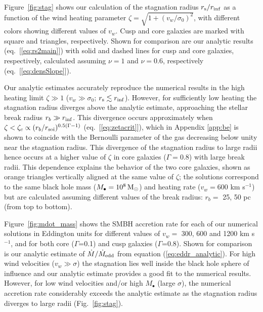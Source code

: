 \documentclass[usenatbib,fleqn]{mn2e}
\newcommand{\Mbh}[1][]{M_{\bullet#1}}
\newcommand{\vwO}{v_{w}}
\newcommand{\densSlope}{\nu}
\begin{document}
Figure~\ref{fig:stag} shows our calculation of the stagnation radius
$r_{\rm s}/r_{\rm inf}$ as a function of the wind heating parameter
$\zeta = \sqrt{1+(v_w/\sigma_0)^{2}}$, with different colors
showing different values of $v_{w}$.  Cusp and core galaxies are
marked with square and triangles, respectively.  Shown for comparison
are our analytic results (eq.~[\ref{eq:rs2main}]) with solid and
dashed lines for cusp and core galaxies, respectively, calculated
assuming $\densSlope = 1$ and $\densSlope= 0.6$, respectively
(eq.~[\ref{eq:densSlope}]).

Our analytic estimates accurately reproduce the numerical results in
the high heating limit $\zeta \gg 1$ ($v_w \gg \sigma_0$; $r_{\rm s}
\lesssim r_{\rm inf}$).  However, for sufficiently low heating the
stagnation radius diverges above the analytic estimate, approaching
the stellar break radius $r_b \gg r_{\rm inf}$.  This divergence
occurs approximately when $\zeta < \zeta_c \propto (r_b/r_{\rm
  soi})^{0.5(\Gamma-1)}$ (eq.~[\ref{eq:zetacrit}]), which in Appendix
\ref{app:be} is shown to coincide with the Bernoulli parameter of the gas decreasing below unity near the stagnation radius.  This divergence of the stagnation radius to large radii hence occurs at a higher value of $\zeta$ in core galaxies ($\Gamma = 0.8$) with large break radii.  This dependence explains the behavior of the two core galaxies, shown as
orange triangles vertically aligned at the same value of
$\zeta$; the solutions correspond to the same black hole mass
($\Mbh = 10^8 \Msun$) and heating rate ($v_w = 600$ km s$^{-1}$) but are calculated assuming
different values of the break radius: $r_{b} =$ 25, 50 pc (from top to
bottom). 

Figure~\ref{fig:mdot_mass} shows the SMBH accretion rate for each of
our numerical solutions in Eddington units for different values of
$\vwO =$ 300, 600 and 1200 km s$^{-1}$, and for both core
($\Gamma$=0.1) and cusp galaxies ($\Gamma$=0.8).  Shown for comparison
is our analytic estimate of $\dot{M}/\dot{M}_{\rm edd}$ from equation
(\ref{eq:eddr_analytic}).  For high wind velocities ($v_{w} \gg
\sigma$) the stagnation lies well inside the black hole sphere of
influence and our analytic estimate provides a good fit to the
numerical results.  However, for low wind velocities and/or high
$M_{\bullet}$ (large $\sigma$), the numerical accretion rate
considerably exceeds the analytic estimate as the stagnation radius
diverges to large radii (Fig.~\ref{fig:stag}).
\end{document}
